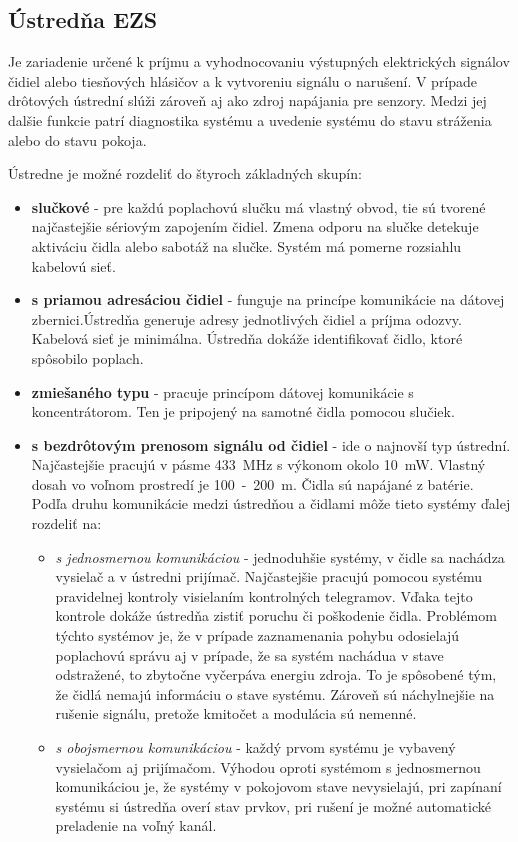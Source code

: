 \subsection{Ústredňa EZS}

Je zariadenie určené k príjmu a vyhodnocovaniu výstupných elektrických signálov čidiel alebo tiesňových hlásičov a k vytvoreniu signálu o narušení. V prípade drôtových ústrední slúži zároveň aj ako zdroj napájania pre senzory. Medzi jej dalšie funkcie patrí diagnostika systému a uvedenie systému do stavu stráženia alebo do stavu pokoja.

Ústredne je možné rozdeliť do štyroch základných skupín:
\begin{itemize}
    \item \textbf{slučkové} - pre každú poplachovú slučku má vlastný obvod, tie sú tvorené najčastejšie sériovým zapojením čidiel. Zmena odporu na slučke detekuje aktiváciu čidla alebo sabotáž na slučke. Systém má pomerne rozsiahlu kabelovú sieť.
    \item \textbf{s priamou adresáciou čidiel} - funguje na princípe komunikácie na dátovej zbernici.Ústredňa generuje adresy jednotlivých čidiel a príjma odozvy. Kabelová sieť je minimálna. Ústredňa dokáže identifikovať čidlo, ktoré spôsobilo poplach.
    \item \textbf{zmiešaného typu} - pracuje princípom dátovej komunikácie s koncentrátorom. Ten je pripojený na samotné čidla pomocou slučiek.
    \item \textbf{s bezdrôtovým prenosom signálu od čidiel} - ide o najnovší typ ústrední. Najčastejšie pracujú v pásme 433~MHz s výkonom okolo 10~mW. Vlastný dosah vo voľnom prostredí je 100~-~200~m. Čidla sú napájané z batérie.
    Podľa druhu komunikácie medzi ústredňou a čidlami môže tieto systémy ďalej rozdeliť na:
    \begin{itemize}
        \item \textit{s jednosmernou komunikáciou} - jednoduhšie systémy, v čidle sa nachádza vysielač a v ústredni prijímač. Najčastejšie pracujú pomocou systému pravidelnej kontroly visielaním kontrolných telegramov. Vďaka tejto kontrole dokáže ústredňa zistiť poruchu či poškodenie čidla. Problémom týchto systémov je, že v prípade zaznamenania pohybu odosielajú poplachovú správu aj v prípade, že sa systém nachádua v stave odstražené, to zbytočne vyčerpáva energiu zdroja. To je spôsobené tým, že čidlá nemajú informáciu o stave systému. Zároveň sú náchylnejšie na rušenie signálu, pretože kmitočet a modulácia sú nemenné.
        \item \textit{s obojsmernou komunikáciou} - každý prvom systému je vybavený vysielačom aj prijímačom. Výhodou oproti systémom s jednosmernou komunikáciou je, že systémy v pokojovom stave nevysielajú, pri zapínaní systému si ústredňa overí stav prvkov, pri rušení je možné automatické preladenie na voľný kanál.
    \end{itemize}
\end{itemize}

